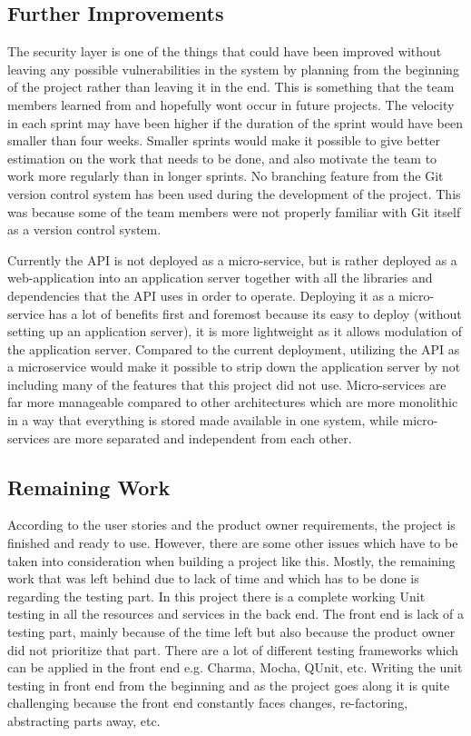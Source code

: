 \subsection{Further Improvements}
\label{sec:furtherImprovements}
The security layer is one of the things that could have been improved without leaving any possible vulnerabilities in the system by planning from the beginning of the project rather than leaving it in the end. This is something that the team members learned from and hopefully wont occur in future projects. The velocity in each sprint may have been higher if the duration of the sprint would have been smaller than four weeks. Smaller sprints would make it possible to give better estimation on the work that needs to be done, and also motivate the team to work more regularly than in longer sprints. 
No branching feature from the Git version control system has been used during the development of the project. This was because some of the team members were not properly familiar with Git itself as a version control system.

Currently the API is not deployed as a micro-service, but is rather deployed as a web-application into an application server together with all the libraries and dependencies that the API uses in order to operate. Deploying it as a micro-service has a lot of benefits first and foremost because its easy to deploy (without setting up an application server), it is 
more lightweight as it allows modulation of the application server. Compared to the current deployment, utilizing the API as a microservice would make it possible to strip down the application server by not including many of the features that this project did not use. Micro-services are far more manageable compared to other architectures which are more monolithic in a way that everything is stored made available in one system, while micro-services are more separated and independent from each other.
\subsection{Remaining Work}
According to the user stories and the product owner requirements, the project is finished and ready to use. However, there are some other issues which have to be taken into consideration when building a project like this. Mostly, the remaining work that was left behind due to lack of time and which has to be done is regarding the testing part. In this project there is a complete working Unit testing in all the resources and services in the back end. The front end is lack of a testing part, mainly because of the time left but also because the product owner did not prioritize that part. There are a lot of different testing frameworks which can be applied in the front end e.g. Charma, Mocha, QUnit, etc. Writing the unit testing in front end from the beginning and as the project goes along it is quite challenging because the front end constantly faces changes, re-factoring, abstracting parts away, etc. 

